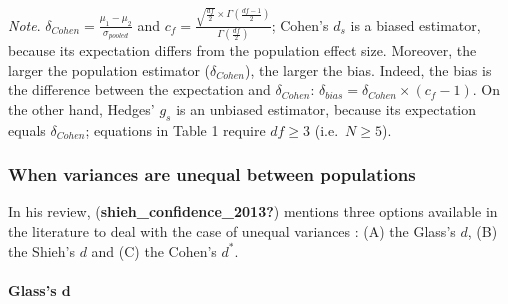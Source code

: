 \documentclass[
  english,
  man]{apa6}
\let\oldparagraph\paragraph
\renewcommand{\paragraph}[1]{\oldparagraph{#1}\mbox{}}
\begin{document}
\emph{Note}. \(\delta_{Cohen}= \frac{\mu_1-\mu_2}{\sigma_{pooled}}\) and \(c_f=\frac{\sqrt{\frac{df}{2}} \times \Gamma\left( \frac{df-1}{2}\right)}{\Gamma\left( \frac{df}{2}\right)}\); Cohen's \(d_s\) is a biased estimator, because its expectation differs from the population effect size. Moreover, the larger the population estimator (\(\delta_{Cohen}\)), the larger the bias. Indeed, the bias is the difference between the expectation and \(\delta_{Cohen}\): \(\delta_{bias} = \delta_{Cohen} \times (c_f-1)\). On the other hand, Hedges' \(g_s\) is an unbiased estimator, because its expectation equals \(\delta_{Cohen}\); equations in Table 1 require \(df \ge 3\) (i.e.~\(N \ge 5\)).

\elandscape

\hypertarget{when-variances-are-unequal-between-populations}{%
\subsubsection{When variances are unequal between populations}\label{when-variances-are-unequal-between-populations}}

In his review, (\textbf{shieh\_confidence\_2013?}) mentions three options available in the literature to deal with the case of unequal variances : (A) the Glass's \(d\), (B) the Shieh's \(d\) and (C) the Cohen's \(d^*\).

\hypertarget{glasss-bmd}{%
\paragraph{\texorpdfstring{Glass's \(\bm{d}\)}{Glass's \textbackslash bm\{d\}}}\label{glasss-bmd}}
\end{document}
